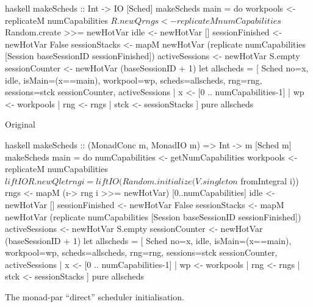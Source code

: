 \begin{listing}
  \begin{sublisting}{\textwidth}
    \centering
    \begin{cminted}{haskell}
makeScheds :: Int -> IO [Sched]
makeScheds main = do
   workpools <- replicateM numCapabilities $ R.newQ
   rngs <- replicateM numCapabilities $ Random.create >>= newHotVar
   idle <- newHotVar []
   sessionFinished <- newHotVar False
   sessionStacks   <- mapM newHotVar
     (replicate numCapabilities [Session baseSessionID sessionFinished])
   activeSessions  <- newHotVar S.empty
   sessionCounter  <- newHotVar (baseSessionID + 1)
   let allscheds = [ Sched { no=x, idle, isMain=(x==main), workpool=wp,
                             scheds=allscheds, rng=rng, sessions=stck
                             sessionCounter, activeSessions
                           }
                   | x   <- [0 .. numCapabilities-1]
                   | wp  <- workpools
                   | rng <- rngs
                   | stck <- sessionStacks
                   ]
   pure allscheds
    \end{cminted}
    \caption{Original}\label{lst:parmonad_orig}
  \end{sublisting}

  \vspace{2.5em}

  \begin{sublisting}{\textwidth}
    \centering
    \begin{cminted}{haskell}
makeScheds :: (MonadConc m, MonadIO m) => Int -> m [Sched m]
makeScheds main = do
   numCapabilities <- getNumCapabilities
   workpools <- replicateM numCapabilities $ liftIO R.newQ
   let rng i = liftIO (Random.initialize (V.singleton $ fromIntegral i))
   rngs <- mapM (\i -> rng i >>= newHotVar) [0..numCapabilities]
   idle <- newHotVar []
   sessionFinished <- newHotVar False
   sessionStacks   <- mapM newHotVar
     (replicate numCapabilities [Session baseSessionID sessionFinished])
   activeSessions  <- newHotVar S.empty
   sessionCounter  <- newHotVar (baseSessionID + 1)
   let allscheds = [ Sched { no=x, idle, isMain=(x==main), workpool=wp,
                             scheds=allscheds, rng=rng, sessions=stck
                             sessionCounter, activeSessions
                           }
                   | x   <- [0 .. numCapabilities-1]
                   | wp  <- workpools
                   | rng <- rngs
                   | stck <- sessionStacks
                   ]
   pure allscheds
    \end{cminted}
    \caption{\dejafu{}}\label{lst:parmonad_dejafu}
  \end{sublisting}
  \caption{The monad-par ``direct'' scheduler initialisation.}\label{lst:parmonad}
\end{listing}

